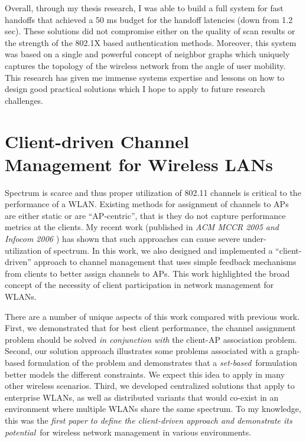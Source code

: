 \documentclass[11pt,letterpaper]{article}
\begin{document}
Overall, through my thesis research, I was able to build a full system for fast handoffs that achieved a 50 ms budget
for the handoff latencies (down from 1.2 sec). These solutions did not compromise either on the quality of scan results
or the strength of the 802.1X based authentication methods. Moreover, this system was based on a single and powerful
concept of neighbor graphs which uniquely captures the topology of the wireless network from the angle of user mobility.
This research has given me immense systems expertise and lessons on how to design good practical solutions which I hope
to apply to future research challenges.



\section{Client-driven Channel Management for Wireless LANs} Spectrum is scarce and thus proper utilization of 802.11
channels is critical to the performance of a WLAN. Existing methods for assignment of channels to APs are either static
or are ``AP-centric'', that is they do not capture performance metrics at the clients. My recent work (published 
in {\it ACM MCCR 2005 \cite{graph2005} and Infocom 2006 \cite{infocom2006}}) has shown that such approaches can cause severe
under-utilization of spectrum. In this work, we also designed and implemented a ``client-driven'' approach to channel
management  that uses simple feedback mechanisms from clients to better assign channels to APs. This work highlighted
the broad concept of the necessity of client participation in network management for WLANs.


There are a number of unique aspects of this work compared with previous work.  First, we demonstrated that for best
client performance, the channel assignment problem should be solved {\em in conjunction with} the client-AP association
problem.  Second, our solution approach illustrates some problems associated with a graph-based formulation of the
problem and demonstrates that a {\em set-based}\ formulation better models the different constraints. We expect this
idea to apply in many other wireless scenarios.  Third, we developed centralized solutions that apply to enterprise
WLANs, as well as distributed variants that would co-exist in an environment where multiple WLANs share the same
spectrum. To my knowledge, this was the {\em first paper to define the client-driven approach and demonstrate its
potential}\ for wireless network management in various environments.
\end{document}
